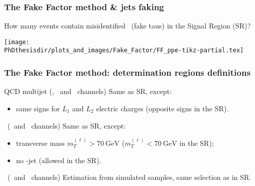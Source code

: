 \begin{frame}
\frametitle{The Fake Factor method \& jets faking \tauh}

\manip How many events contain misidentified \tauh\ (fake taus) in the Signal Region (SR)?


\begin{center}
\texttt{[image: \\PhDthesisdir/plots\_and\_images/Fake\_Factor/FF\_ppe-tikz-partial.tex]}
\end{center}
\end{frame}



\begin{frame}
\frametitle{The Fake Factor method: determination regions definitions}

\begin{block}{QCD multijet (\tauh\tauh, \mu\tauh\ and \ele\tauh\ channels)}
Same as SR, except:
\begin{itemize}
\item same signs for $L_1$ and $L_2$ electric charges (opposite signs in the SR).
\end{itemize}
\end{block}

\pause\vfill

\begin{block}{\Wjets\ (\mu\tauh\ and \ele\tauh\ channels)}
Same as SR, except:
\begin{itemize}
\item transverse mass $m_T^{(\ell)}>\SI{70}{\GeV}$ ($m_T^{(\ell)}<\SI{70}{\GeV}$ in the SR);
\item no \quarkb-jet (allowed in the SR).
\end{itemize}
\end{block}

\pause\vfill

\begin{block}{\ttbar\ (\mu\tauh\ and \ele\tauh\ channels)}
Estimation from simulated samples, same selection as in SR.
\end{block}

\vfill
\end{frame}

